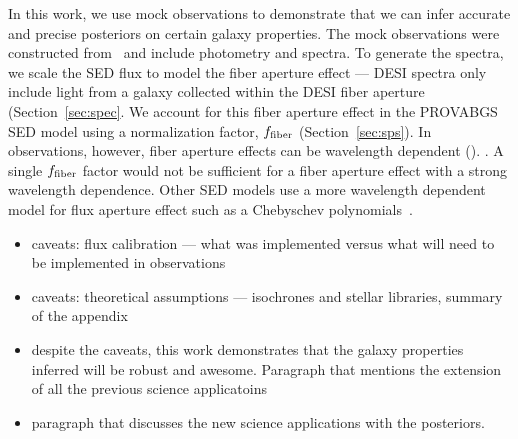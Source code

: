 In this work, we use mock observations to demonstrate that we can infer
accurate and precise posteriors on certain galaxy properties.
The mock observations were constructed from \lgal~and include photometry and
spectra. 
To generate the spectra, we scale the SED flux to model the fiber aperture
effect --- DESI spectra only include light from a galaxy collected within the
DESI fiber aperture (Section~\ref{sec:spec}. 
We account for this fiber aperture effect in the {\sc PROVABGS} SED model using 
a normalization factor, $f_{\rm fiber}$ (Section~\ref{sec:sps}). 
In observations, however, fiber aperture effects can be wavelength dependent
(). 
. 
A single $f_{\rm fiber}$ factor would not be sufficient for a fiber aperture
effect with a strong wavelength dependence. 
Other SED models use a more wavelength dependent model for flux aperture effect
such as a Chebyschev polynomials~\citep[\emph{e.g.}][]{}. 
\begin{itemize}
    \item caveats: flux calibration --- what was implemented versus what will
    need to be implemented in observations
\end{itemize}


\begin{itemize}
    \item caveats: theoretical assumptions --- isochrones and stellar
        libraries, summary of the appendix
\end{itemize}

\begin{itemize}
\item despite the caveats, this work demonstrates that the galaxy
    properties inferred will be robust and awesome. Paragraph that mentions
    the extension of all the previous science applicatoins 
\item paragraph that discusses the new science applications with the
    posteriors. 
\end{itemize}
